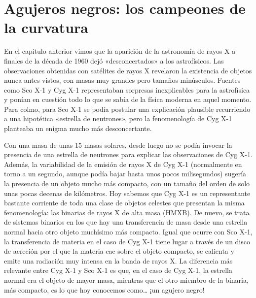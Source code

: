 \chapter[Agujeros negros]{Agujeros negros: los campeones de la curvatura}\label{ch:06}


En el capítulo anterior vimos que la aparición de la astronomía de rayos X a finales de la década de 1960 dejó «desconcertados» a los astrofísicos. Las observaciones obtenidas con satélites de rayos X revelaron la existencia de objetos nunca antes vistos, con masas muy grandes pero tamaños minúsculos. Fuentes como Sco X-1 y Cyg X-1 representaban sorpresas inexplicables para la astrofísica y ponían en cuestión todo lo que se sabía de la física moderna en aquel momento. Para colmo, para Sco X-1 se podía postular una explicación plausible recurriendo a una hipotética «estrella de neutrones», pero la fenomenología de Cyg X-1 planteaba un enigma mucho más desconcertante.

Con una masa de unas 15 masas solares, desde luego no se podía invocar la presencia de una estrella de neutrones para explicar las observaciones de Cyg X-1. Además, la variabilidad de la emisión de rayos X de Cyg X-1 (normalmente en torno a un segundo, aunque podía bajar hasta unos pocos milisegundos) sugería la presencia de un objeto mucho más compacto, con un tamaño del orden de solo unas pocas decenas de kilómetros. Hoy sabemos que Cyg X-1 es un representante bastante corriente de toda una clase de objetos celestes que presentan la misma fenomenología: las binarias de rayos X de alta masa (HMXB). De nuevo, se trata de sistemas binarios en los que hay una transferencia de masa desde una estrella normal hacia otro objeto muchísimo más compacto. Igual que ocurre con Sco X-1, la transferencia de materia en el caso de Cyg X-1 tiene lugar a través de un disco de acreción por el que la materia cae sobre el objeto compacto, se calienta y emite una radiación muy intensa en la banda de rayos X. La diferencia más relevante entre Cyg X-1 y Sco X-1 es que, en el caso de Cyg X-1, la estrella normal era el objeto de mayor masa, mientras que el otro miembro de la binaria, más compacto, es lo que hoy conocemos como… ¡un agujero negro!

